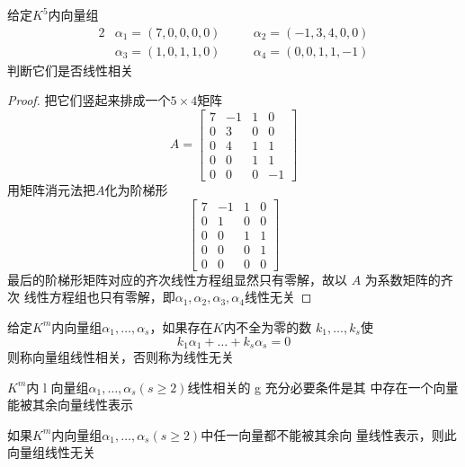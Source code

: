 \documentclass[11pt]{article}
\begin{document}
\begin{proposition}[]
给定\(K^5\)内向量组
\begin{alignat*}{2}
&\alpha_1=(7,0,0,0,0)&&\alpha_2=(-1,3,4,0,0)\\
&\alpha_3=(1,0,1,1,0)\quad&&\alpha_4=(0,0,1,1,-1)
\end{alignat*}
判断它们是否线性相关
\end{proposition}

\begin{proof}
把它们竖起来排成一个\(5\times4\)矩阵
\begin{equation*}
A=
\begin{bmatrix}
7&-1&1&0\\
0&3&0&0\\
0&4&1&1\\
0&0&1&1\\
0&0&0&-1
\end{bmatrix}
\end{equation*}
用矩阵消元法把\(A\)化为阶梯形
\begin{equation*}
\begin{bmatrix}
7&-1&1&0\\
0&1&0&0\\
0&0&1&1\\
0&0&0&1\\
0&0&0&0
\end{bmatrix}
\end{equation*}
最后的阶梯形矩阵对应的齐次线性方程组显然只有零解，故以 \(A\) 为系数矩阵的齐次
线性方程组也只有零解，即\(\alpha_1,\alpha_2,\alpha_3,\alpha_4\)线性无关
\end{proof}

\begin{definition}[]
给定\(K^m\)内向量组\(\alpha_1,\dots,\alpha_s\)，如果存在\(K\)内不全为零的数
\(k_1,\dots,k_s\)使
\begin{equation*}
k_1\alpha_1+\dots+k_s\alpha_s=0
\end{equation*}
则称向量组线性相关，否则称为线性无关
\end{definition}

\begin{proposition}[]
\(K^m\)内 l 向量组\(\alpha_1,\dots,\alpha_s(s\ge2)\)线性相关的 g 充分必要条件是其
中存在一个向量能被其余向量线性表示
\end{proposition}

\begin{corollary}[]
如果\(K^m\)内向量组\(\alpha_1,\dots,\alpha_s(s\ge2)\)中任一向量都不能被其余向
量线性表示，则此向量组线性无关
\end{corollary}
\end{document}
